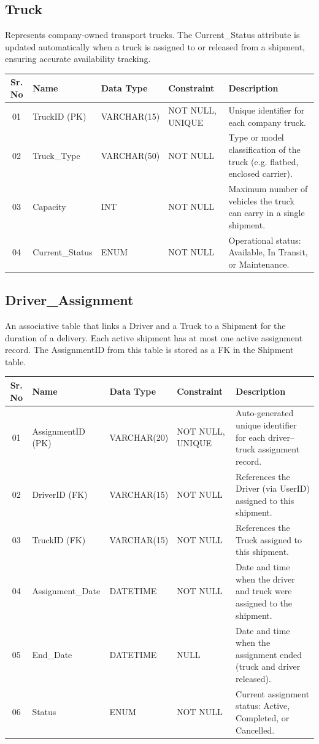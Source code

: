 \documentclass[12pt,a4paper]{report}
\begin{document}
\subsection{Truck}

Represents company-owned transport trucks. The Current\_Status attribute is updated automatically when a truck is assigned to or released from a shipment, ensuring accurate availability tracking.

\begin{longtable}{|c|p{3.8cm}|p{2.5cm}|p{3.5cm}|p{5.5cm}|}
\hline
\textbf{Sr. No} & \textbf{Name} & \textbf{Data Type} & \textbf{Constraint} & \textbf{Description} \\
\hline
01 & TruckID (PK) & VARCHAR(15) & NOT NULL, UNIQUE & Unique identifier for each company truck. \\
\hline
02 & Truck\_Type & VARCHAR(50) & NOT NULL & Type or model classification of the truck (e.g. flatbed, enclosed carrier). \\
\hline
03 & Capacity & INT & NOT NULL & Maximum number of vehicles the truck can carry in a single shipment. \\
\hline
04 & Current\_Status & ENUM & NOT NULL & Operational status: Available, In Transit, or Maintenance. \\
\hline
\end{longtable}


\subsection{Driver\_Assignment}

An associative table that links a Driver and a Truck to a Shipment for the duration of a delivery. Each active shipment has at most one active assignment record. The AssignmentID from this table is stored as a FK in the Shipment table.

\begin{longtable}{|c|p{3.8cm}|p{2.5cm}|p{3.5cm}|p{5.5cm}|}
\hline
\textbf{Sr. No} & \textbf{Name} & \textbf{Data Type} & \textbf{Constraint} & \textbf{Description} \\
\hline
01 & AssignmentID (PK) & VARCHAR(20) & NOT NULL, UNIQUE & Auto-generated unique identifier for each driver–truck assignment record. \\
\hline
02 & DriverID (FK) & VARCHAR(15) & NOT NULL & References the Driver (via UserID) assigned to this shipment. \\
\hline
03 & TruckID (FK) & VARCHAR(15) & NOT NULL & References the Truck assigned to this shipment. \\
\hline
04 & Assignment\_Date & DATETIME & NOT NULL & Date and time when the driver and truck were assigned to the shipment. \\
\hline
05 & End\_Date & DATETIME & NULL & Date and time when the assignment ended (truck and driver released). \\
\hline
06 & Status & ENUM & NOT NULL & Current assignment status: Active, Completed, or Cancelled. \\
\hline
\end{longtable}
\end{document}
